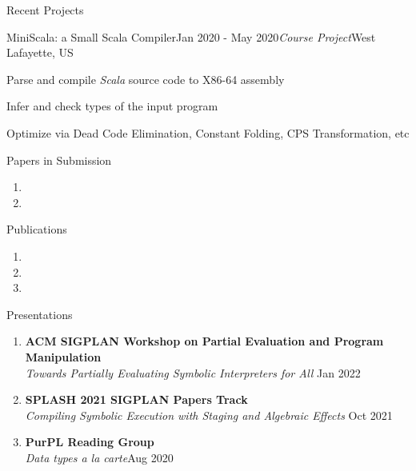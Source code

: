 \documentclass{resume} %
\begin{document}
\begin{rSection}{Recent Projects}
\begin{rSubsection}{MiniScala: a Small Scala Compiler}{Jan 2020 - May 2020}{\textit{Course Project}}{West Lafayette, US}
\item Parse and compile \textit{Scala} source code to X86-64 assembly
\item Infer and check types of the input program
\item Optimize via Dead Code Elimination, Constant Folding, CPS Transformation, etc

\end{rSubsection}


\end{rSection}

\begin{rSection}{Papers in Submission}
    \begin{enumerate}
        \item {}
        \item {}
    \end{enumerate}
\end{rSection}

\begin{rSection}{Publications}
\begin{enumerate}
    \item {}
    \item {}
    \item {}
\end{enumerate}

        

\end{rSection}

\begin{rSection}{Presentations}
\begin{enumerate}
\item \textbf{ACM SIGPLAN Workshop on Partial Evaluation and Program Manipulation}\\
\textit{Towards Partially Evaluating Symbolic Interpreters for All} \hfill Jan 2022
\item \textbf{SPLASH 2021 SIGPLAN Papers Track}\\
\textit{Compiling Symbolic Execution with Staging and Algebraic Effects} \hfill Oct 2021
\item \textbf{PurPL Reading Group} \\
\textit{Data types a la carte}\hfill Aug 2020
\end{enumerate}


\end{rSection}
\end{document}
